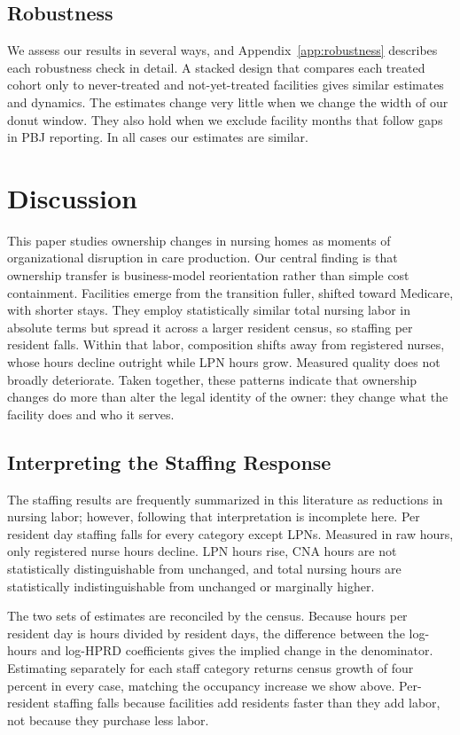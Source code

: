 \documentclass[12pt]{article}
\begin{document}
\subsection{Robustness}

We assess our results in several ways, and Appendix~\ref{app:robustness} describes each robustness check in detail. A stacked design that compares each treated cohort only to never-treated and not-yet-treated facilities gives similar estimates and dynamics. The estimates change very little when we change the width of our donut window. They also hold when we exclude facility months that follow gaps in PBJ reporting. In all cases our estimates are similar. 

\section{Discussion}\label{sec:discussion}

This paper studies ownership changes in nursing homes as moments of organizational disruption in care production. Our central finding is that ownership transfer is business-model reorientation rather than simple cost containment. Facilities emerge from the transition fuller, shifted toward Medicare, with shorter stays. They employ statistically similar total nursing labor in absolute terms but spread it across a larger resident census, so staffing per resident falls. Within that labor, composition shifts away from registered nurses, whose hours decline outright while LPN hours grow. Measured quality does not broadly deteriorate. Taken together, these patterns indicate that ownership changes do more than alter the legal identity of the owner: they change what the facility does and who it serves.

\subsection{Interpreting the Staffing Response}

The staffing results are frequently summarized in this literature as reductions in nursing labor; however, following that interpretation is incomplete here. Per resident day staffing falls for every category except LPNs. Measured in raw hours, only registered nurse hours decline. LPN hours rise, CNA hours are not statistically distinguishable from unchanged, and total nursing hours are statistically indistinguishable from unchanged or marginally higher.

The two sets of estimates are reconciled by the census. Because hours per resident day is hours divided by resident days, the difference between the log-hours and log-HPRD coefficients gives the implied change in the denominator. Estimating separately for each staff category returns census growth of four percent in every case, matching the occupancy increase we show above. Per-resident staffing falls because facilities add residents faster than they add labor, not because they purchase less labor.
\end{document}
